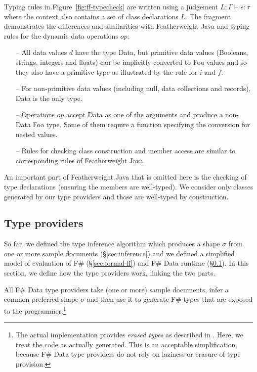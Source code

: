 \documentclass[10pt,nocopyrightspace]{sigplanconf}
\newcommand{\kvd}[1]{\textnormal{\textcolor{kvdclr}{\sffamily #1}}}
\newcommand{\ident}[1]{\textnormal{\sffamily #1}}
\begin{document}
Typing rules in Figure~\ref{fig:ff-typecheck} are written using a judgement
$L; \Gamma \vdash e : \tau$ where the context also contains a set of class declarations $L$.
The fragment demonstrates the differences and similarities with Featherweight Java \cite{fwjava} and
typing rules for the dynamic data operations $op$:
%
\begin{itemize}
\item[--] All data values $d$ have the type \ident{Data}, but primitive data values (Booleans,
  strings, integers and floats) can be implicitly converted to Foo values and so they also have a
  primitive type as illustrated by the rule for $i$ and $f$.

\item[--] For non-primitive data values (including \kvd{null}, data collections and records),
  \ident{Data} is the only type.

\item[--] Operations $op$ accept \ident{Data} as one of the arguments and produce a non-\ident{Data}
  Foo type. Some of them require a function specifying the conversion for nested values.

\item[--] Rules for checking class construction and member access are similar to corresponding
  rules of Featherweight Java.
\end{itemize}
%
An important part of Featherweight Java that is omitted here is the checking of type declarations
(ensuring the members are well-typed). We consider only classes generated by our type providers
and those are well-typed by construction.


\subsection{Type providers}
\label{sec:formal-tp}

So far, we defined the type inference algorithm which produces a shape $\sigma$ from one
or more sample documents (\S\ref{sec:inference}) and we defined a simplified model of evaluation
of F\# (\S\ref{sec:formal-ff}) and F\# Data runtime (\S\ref{sec:formal-tp}). In this section, we
define how the type providers work, linking the two parts.

All F\# Data type providers take (one or more) sample documents, infer a common preferred shape $\sigma$
and then use it to generate F\# types that are exposed to the programmer.\footnote{The actual
implementation provides \emph{erased types} as described in \cite{fsharp-typeprov}. Here, we treat
the code as actually generated. This is an acceptable simplification, because F\# Data type providers
do not rely on laziness or erasure of type provision.}
\end{document}
